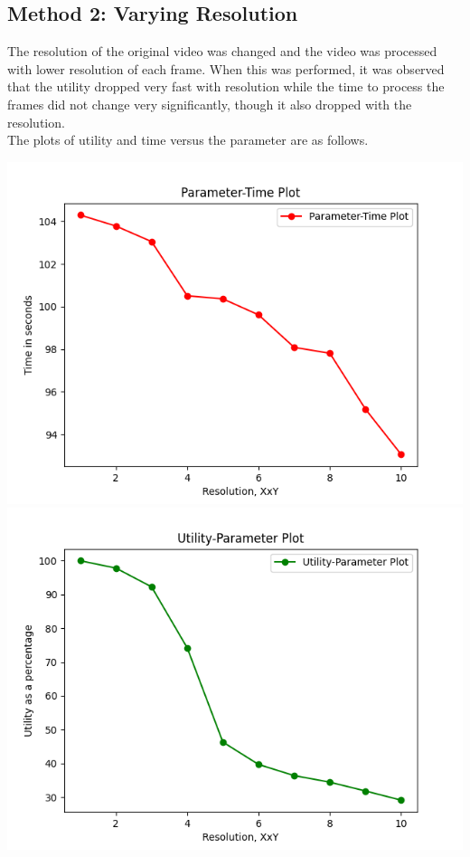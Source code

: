 \documentclass{article} %
\begin{document}
\subsection{Method 2: Varying Resolution}
The resolution of the original video was changed and the video was processed with lower resolution of each frame. When this was performed, it was observed that the utility dropped very fast with resolution while the time to process the frames did not change very significantly, though it also dropped with the resolution.
\\The plots of utility and time versus the parameter are as follows.

\begin{center}
    \includegraphics[scale = 0.8]{out_images/method_2_time.png}
    \\\includegraphics[scale = 0.9]{out_images/method_2_utility_param.png}

\end{center}
\end{document}
